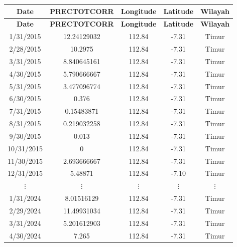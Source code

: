 \begin{longtable}{|c|c|c|c|c|}
    \hline
    \textbf{Date} & \textbf{PRECTOTCORR} & \textbf{Longitude} & \textbf{Latitude} & \textbf{Wilayah} \\
    \hline
    \endfirsthead

    \hline
    \textbf{Date} & \textbf{PRECTOTCORR} & \textbf{Longitude} & \textbf{Latitude} & \textbf{Wilayah} \\
    \hline
    \endhead

    \hline
    \endfoot

    \hline
    \endlastfoot

    1/31/2015  & 12.24129032 & 112.84 & -7.31 & Timur \\
    2/28/2015  & 10.2975      & 112.84 & -7.31 & Timur \\
    3/31/2015  & 8.840645161  & 112.84 & -7.31 & Timur \\
    4/30/2015  & 5.790666667  & 112.84 & -7.31 & Timur \\
    5/31/2015  & 3.477096774  & 112.84 & -7.31 & Timur \\
    6/30/2015  & 0.376        & 112.84 & -7.31 & Timur \\
    7/31/2015  & 0.15483871   & 112.84 & -7.31 & Timur \\
    8/31/2015  & 0.219032258  & 112.84 & -7.31 & Timur \\
    9/30/2015  & 0.013        & 112.84 & -7.31 & Timur \\
    10/31/2015 & 0            & 112.84 & -7.31 & Timur \\
    11/30/2015 & 2.693666667  & 112.84 & -7.31 & Timur \\
    12/31/2015 & 5.48871      & 112.84 & -7.10 & Timur \\
    \multicolumn{1}{|c|}{$\vdots$} &
    \multicolumn{1}{c|}{$\vdots$} &
    \multicolumn{1}{c|}{$\vdots$} &
    \multicolumn{1}{c|}{$\vdots$} &
    \multicolumn{1}{c|}{$\vdots$} \\
    1/31/2024  & 8.01516129   & 112.84 & -7.31 & Timur \\
    2/29/2024  & 11.49931034  & 112.84 & -7.31 & Timur \\
    3/31/2024  & 5.201612903  & 112.84 & -7.31 & Timur \\
    4/30/2024  & 7.265        & 112.84 & -7.31 & Timur \\

\end{longtable}
